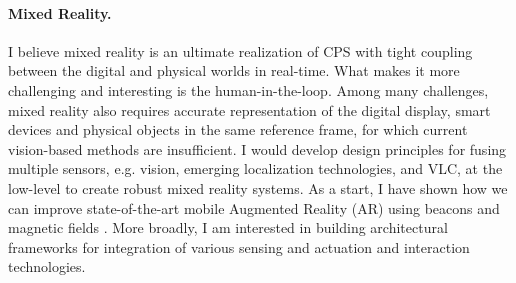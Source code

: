 \documentclass[10pt]{article}
\begin{document}

\paragraph{Mixed Reality. }
I believe mixed reality is an ultimate realization of CPS with tight coupling between the digital and physical worlds in real-time. What makes it more challenging and interesting is the human-in-the-loop. %
Among many challenges, mixed reality also requires accurate representation of the digital display, smart devices and physical objects in the same reference frame, for which current vision-based methods are insufficient. I would develop design principles for fusing multiple sensors, e.g. vision, emerging localization technologies, and VLC, at the low-level to create robust mixed reality systems. As a start, I have shown how we can improve state-of-the-art mobile Augmented Reality (AR) using beacons and magnetic fields \cite{mobileAR}. More broadly, I am interested in building architectural frameworks for integration of various sensing and actuation and interaction technologies. %
\end{document}
